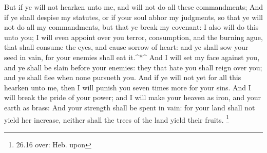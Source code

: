  But if ye will not hearken unto me, and will not do all
these commandments;  And if ye shall despise my statutes,
or if your soul abhor my judgments, so that ye will not do all my
commandments, but that ye break my covenant:  I also will
do this unto you; I will even appoint over you terror, consumption, and
the burning ague, that shall consume the eyes, and cause sorrow of
heart: and ye shall sow your seed in vain, for your enemies shall eat
it.\^{}*\^{}  And I will set my face against you, and ye
shall be slain before your enemies: they that hate you shall reign over
you; and ye shall flee when none pursueth you.  And if ye
will not yet for all this hearken unto me, then I will punish you seven
times more for your sins.  And I will break the pride of
your power; and I will make your heaven as iron, and your earth as
brass:  And your strength shall be spent in vain: for your
land shall not yield her increase, neither shall the trees of the land
yield their fruits. \footnote{26.16 over: Heb. upon}

